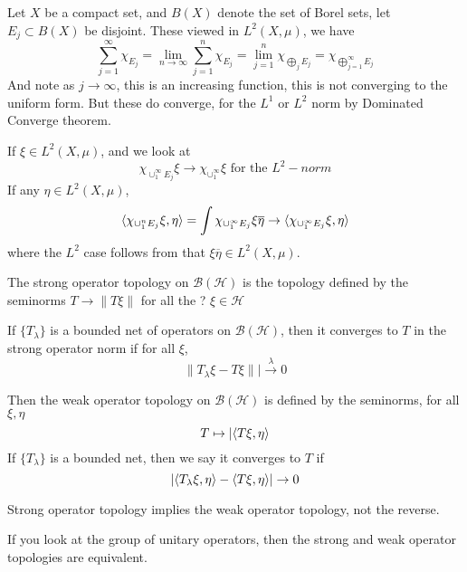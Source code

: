 Let $X$ be a compact set, and $B(X)$ denote the set of Borel sets, let $E_j\subset B(X)$ be disjoint. These viewed in $L^2(X,\mu)$, we have
\begin{equation*}
    \sum_{j=1}^\infty\chi_{E_j}=\lim_{n\to\infty}\sum_{j=1}^n\chi_{E_j}=\lim_{j=1}^n\chi_{\bigoplus_jE_j}=\chi_{\bigoplus_{j=1}^\infty E_j}
\end{equation*}
And note as $j\to\infty$, this is an increasing function, this is not converging to the uniform form. But these do converge, for the $L^1$ or $L^2$ norm by Dominated Converge theorem.

If $\xi\in L^2(X,\mu)$, and we look at 
\begin{equation*}
    \chi_{\cup_1^\infty E_j}\xi\to \chi_{\cup_1^\infty}\xi \text{ for the }L^2-norm
\end{equation*}
If any $\eta\in L^2(X,\mu)$, 
\begin{equation*}
    \langle \chi_{\cup_1^nE_j}\xi, \eta\rangle=\int \chi_{\cup_1^\infty E_j}\xi\overline{\eta}\to \langle \chi_{\cup_1^\infty E_j}\xi, \eta\rangle
\end{equation*}
where the $L^2$ case follows from that $\xi\overline{\eta}\in L^2(X,\mu)$.

\begin{definition}
    The strong operator topology  on $\mathcal{B}(\mathcal{H})$ is the topology defined by the seminorms $T\to \|T\xi\|$ for all the ? $\xi\in\mathcal{H}$
    
    If $\{T_\lambda\}$ is a bounded net of operators on $\mathcal{B}(\mathcal{H})$, then it converges to $T$ in the strong operator norm if for all $\xi$, 
    \begin{equation*}
        \|T_\lambda\xi-T\xi\||\xrightarrow{\lambda} 0
    \end{equation*}
\end{definition}

Then the weak operator topology on $\mathcal{B}(\mathcal{H})$ is defined by the seminorms, for all $\xi, \eta$
\begin{equation*}
    T\mapsto |\langle T\xi, \eta\rangle
\end{equation*}
If $\{T_\lambda\}$ is a bounded net, then we say it converges to $T$ if
\begin{equation*}
    |\langle T_\lambda\xi, \eta\rangle-\langle T\xi, \eta\rangle|\to 0
\end{equation*}
\begin{remark}
    Strong operator topology implies the weak operator topology, not the reverse.
\end{remark}
\begin{remark}
    If you look at the group of unitary operators, then the strong and weak operator topologies are equivalent.
\end{remark}

